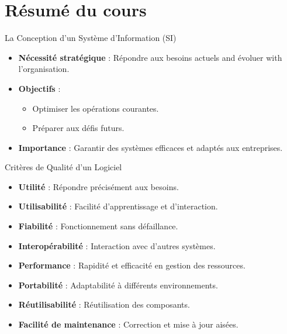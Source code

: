 \documentclass{beamer}
\begin{document}
\section{Résumé du cours}
\begin{frame}{La Conception d’un Système d’Information (SI)}
    \begin{itemize}
        \item \textbf{Nécessité stratégique} : Répondre aux besoins actuels and évoluer with l'organisation.
        \item \textbf{Objectifs} :
        \begin{itemize}
            \item Optimiser les opérations courantes.
            \item Préparer aux défis futurs.
        \end{itemize}
        \item \textbf{Importance} : Garantir des systèmes efficaces et adaptés aux entreprises.
    \end{itemize}
\end{frame}

\begin{frame}{Critères de Qualité d’un Logiciel}
    \begin{itemize}
        \item \textbf{Utilité} : Répondre précisément aux besoins.
        \item \textbf{Utilisabilité} : Facilité d'apprentissage et d'interaction.
        \item \textbf{Fiabilité} : Fonctionnement sans défaillance.
        \item \textbf{Interopérabilité} : Interaction avec d'autres systèmes.
        \item \textbf{Performance} : Rapidité et efficacité en gestion des ressources.
        \item \textbf{Portabilité} : Adaptabilité à différents environnements.
        \item \textbf{Réutilisabilité} : Réutilisation des composants.
        \item \textbf{Facilité de maintenance} : Correction et mise à jour aisées.
    \end{itemize}
\end{frame}
\end{document}
